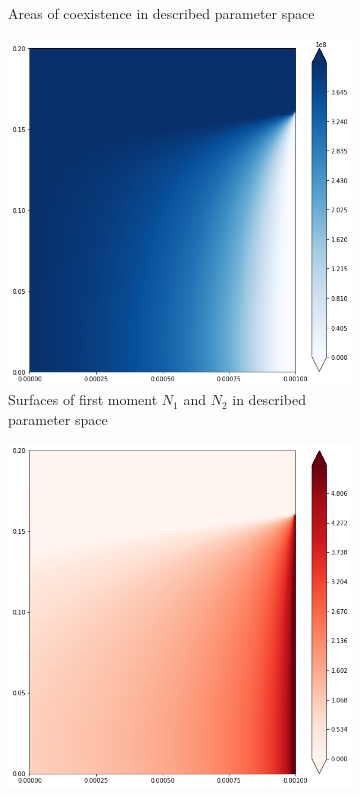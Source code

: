\begin{figure}
\begin{subfigure}{.5\textwidth}
		\caption{Areas of coexistence in described parameter space} 
		\label{fig:cctod1:sub2}
	\end{subfigure}
		\begin{subfigure}{.5\textwidth}
		\centering
		\includegraphics[width=.95\linewidth]{ccto_d1_n1.png}
		\caption{Surfaces of first moment \(N_1\) and \(N_2\) in described parameter space}
		\label{fig:cctod1:sub3}
	\end{subfigure}%
	\begin{subfigure}{.5\textwidth}
		\centering
		\includegraphics[width=.95\linewidth]{ccto_d1_n2.png}

\end{subfigure}
\end{figure}
